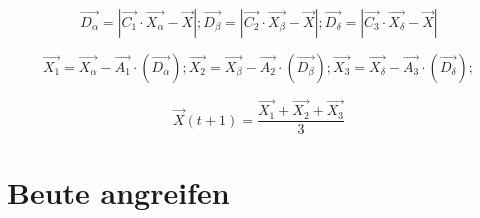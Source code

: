\begin{equation}
    \vec{D_\alpha} = |\vec{C_1} \cdot \vec{X_\alpha} - \vec{X}|;
    \vec{D_\beta} = |\vec{C_2} \cdot \vec{X_\beta} - \vec{X}|;
    \vec{D_\delta} = |\vec{C_3} \cdot \vec{X_\delta} - \vec{X}|
    \label{calcD_abc}
\end{equation}

\begin{equation}
    \vec{X_1} = \vec{X_\alpha} - \vec{A_1} \cdot (\vec{D_\alpha});
    \vec{X_2} = \vec{X_\beta} - \vec{A_2} \cdot (\vec{D_\beta});
    \vec{X_3} = \vec{X_\delta} - \vec{A_3} \cdot (\vec{D_\delta});
    \label{calcX_123}
\end{equation}

\begin{equation}
    \vec{X}(t+1) = \frac{\vec{X_1} + \vec{X_2} + \vec{X_3}}{3}
    \label{calcNextP2}
\end{equation}

\section{Beute angreifen}